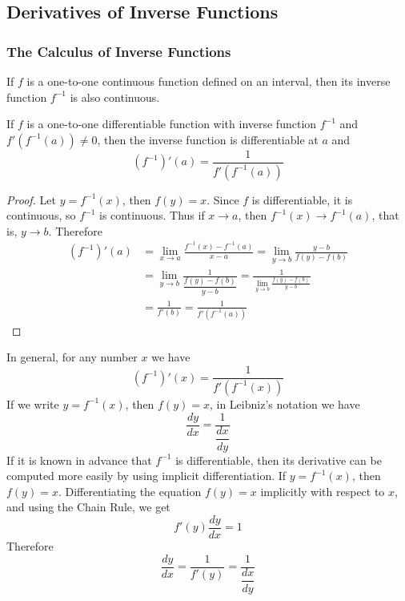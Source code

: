 \subsection{Derivatives of Inverse Functions}

\subsubsection*{The Calculus of Inverse Functions}
\begin{theorem}
    If \(f\) is a one-to-one continuous function defined on an interval,
    then its inverse function \(f^{-1}\) is also continuous.
\end{theorem}
\begin{theorem}
    If \(f\) is a one-to-one differentiable function with inverse function
    \(f^{-1}\) and \(f'(f^{-1}(a))\neq 0\), then the inverse function is
    differentiable at \(a\) and
    \[(f^{-1})'(a)=\frac{1}{f'(f^{-1}(a))}\]
\end{theorem}
\begin{proof}
    Let \(y=f^{-1}(x)\), then \(f(y)=x\).
    Since \(f\) is differentiable, it is continuous, so \(f^{-1}\) is
    continuous.
    Thus if \(x\to a\), then \(f^{-1}(x)\to f^{-1}(a)\), that is, \(y\to b\).
    Therefore
    \begin{align*}
        (f^{-1})'(a)
        &= \lim_{x\to a}\frac{f^{-1}(x)-f^{-1}(a)}{x-a}
        =\lim_{y\to b}\frac{y-b}{f(y)-f(b)} \\
        &= \lim_{y\to b}\frac{1}{\dfrac{f(y)-f(b)}{y-b}}
        =\frac{1}{\displaystyle{\lim_{y\to b}\frac{f(y)-f(b)}{y-b}}} \\
        &= \frac{1}{f'(b)}=\frac{1}{f'(f^{-1}(a))}
    \end{align*}
\end{proof}
In general, for any number \(x\) we have
\[(f^{-1})'(x)=\frac{1}{f'(f^{-1}(x))}\]
If we write \(y=f^{-1}(x)\), then \(f(y)=x\), in Leibniz's notation we have
\[\frac{dy}{dx}=\frac{1}{\dfrac{dx}{dy}}\]
If it is known in advance that \(f^{-1}\) is differentiable, then its
derivative can be computed more easily by using implicit differentiation.
If \(y=f^{-1}(x)\), then \(f(y)=x\).
Differentiating the equation \(f(y)=x\) implicitly with respect to \(x\), and
using the Chain Rule, we get
\[f'(y)\frac{dy}{dx}=1\]
Therefore
\[\frac{dy}{dx}=\frac{1}{f'(y)}=\frac{1}{\dfrac{dx}{dy}}\]

